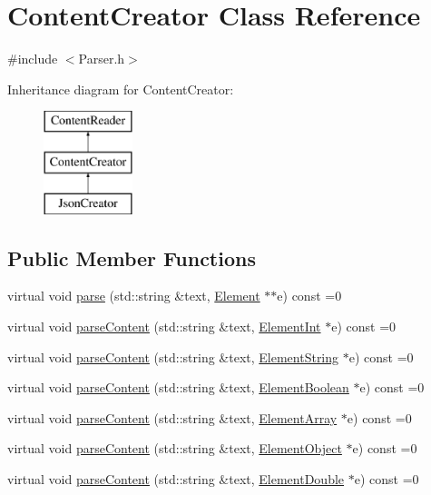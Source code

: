 \hypertarget{classContentCreator}{}\section{Content\+Creator Class Reference}
\label{classContentCreator}


{\ttfamily \#include $<$Parser.\+h$>$}

Inheritance diagram for Content\+Creator\+:\begin{figure}[H]
\begin{center}
\leavevmode
\includegraphics[height=3.000000cm]{classContentCreator}
\end{center}
\end{figure}
\subsection*{Public Member Functions}
\begin{DoxyCompactItemize}
\item 
virtual void \mbox{\hyperlink{classContentReader_a7fff2e63a2e8fa216665604f69974e1d}{parse}} (std\+::string \&text, \mbox{\hyperlink{classElement}{Element}} $\ast$$\ast$e) const =0
\item 
virtual void \mbox{\hyperlink{classContentReader_a7eef37b8b9761e21c0a3907ff94c72f7}{parse\+Content}} (std\+::string \&text, \mbox{\hyperlink{classElementInt}{Element\+Int}} $\ast$e) const =0
\item 
virtual void \mbox{\hyperlink{classContentReader_a310678ddc37a05aca2f13db73b22abe5}{parse\+Content}} (std\+::string \&text, \mbox{\hyperlink{classElementString}{Element\+String}} $\ast$e) const =0
\item 
virtual void \mbox{\hyperlink{classContentReader_a3ee0aec579c723f17742e10fe7c75e39}{parse\+Content}} (std\+::string \&text, \mbox{\hyperlink{classElementBoolean}{Element\+Boolean}} $\ast$e) const =0
\item 
virtual void \mbox{\hyperlink{classContentReader_a91fdd738983dcc7a246c3c163007dfa9}{parse\+Content}} (std\+::string \&text, \mbox{\hyperlink{classElementArray}{Element\+Array}} $\ast$e) const =0
\item 
virtual void \mbox{\hyperlink{classContentReader_a59a8de2bf3436e46b4d029a9b3c3c9da}{parse\+Content}} (std\+::string \&text, \mbox{\hyperlink{classElementObject}{Element\+Object}} $\ast$e) const =0
\item 
virtual void \mbox{\hyperlink{classContentReader_ab4ba739ee5241848ae8af86e64e43a40}{parse\+Content}} (std\+::string \&text, \mbox{\hyperlink{classElementDouble}{Element\+Double}} $\ast$e) const =0
\end{DoxyCompactItemize}



